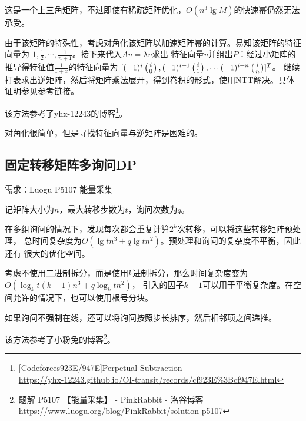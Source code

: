 这是一个上三角矩阵，不过即使有稀疏矩阵优化，$O(n^3\lg M)$的快速幂仍然无法承受。

由于该矩阵的特殊性，考虑对角化该矩阵以加速矩阵幂的计算。易知该矩阵的特征向量为
$1,\frac{1}{2},\cdots,\frac{1}{n+1}$。接下来代入$Av=\lambda v$求出
特征向量$v$并组出$P$：经过小矩阵的推导得特征值$\frac{1}{1+x}$的特征向量为
$[(-1)^i\left(i \atop 0\right),(-1)^{i+1}\left(i \atop 1\right),\cdots (-1)^{i+n}\left(i \atop n\right)]^T$。
继续打表求出逆矩阵，然后将矩阵乘法展开，得到卷积的形式，使用NTT解决。具体证明参见参考链接。

该方法参考了yhx-12243的博客\footnote{
    [Codeforces923E/947E]Perpetual Subtraction\\
    \url{https://yhx-12243.github.io/OI-transit/records/cf923E\%3Bcf947E.html}
}。

对角化很简单，但是寻找特征向量与逆矩阵是困难的。
\subsection{固定转移矩阵多询问DP}
需求：Luogu P5107 能量采集

记矩阵大小为$n$，最大转移步数为$t$，询问次数为$q$。

在多组询问的情况下，发现每次都会重复计算$2^k$次转移，可以将这些转移矩阵预处理，
总时间复杂度为$O(\lg tn^3+q\lg tn^2)$。预处理和询问的复杂度不平衡，因此还有
很大的优化空间。

考虑不使用二进制拆分，而是使用$k$进制拆分，那么时间复杂度变为$O(\log_k t(k-1)n^3+q\log_k tn^2)$，
引入的因子$k-1$可以用于平衡复杂度。在空间允许的情况下，也可以使用根号分块。

如果询问不强制在线，还可以将询问按照步长排序，然后相邻项之间递推。

该方法参考了小粉兔的博客\footnote{
    题解 P5107 【能量采集】 - PinkRabbit - 洛谷博客\\
    \url{https://www.luogu.org/blog/PinkRabbit/solution-p5107}
}。
